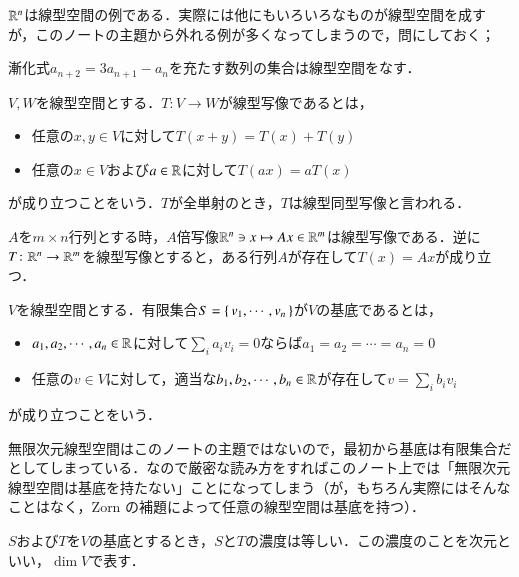 $\mathbb{R}^n$は線型空間の例である．実際には他にもいろいろなものが線型空間を成すが，このノートの主題から外れる例が多くなってしまうので，問にしておく；

\begin{que}
漸化式$a_{n+2} = 3a_{n+1} - a_n$を充たす数列の集合は線型空間をなす．
\end{que}

\begin{defi}
$V,W$を線型空間とする．$T \colon V \to W$が線型写像であるとは，
\begin{itemize}
\item 任意の$x,y \in V$に対して$T(x + y)=T(x) + T(y)$
\item 任意の$x \in V$および$a \in \mathbb{R}$に対して$T(ax) = aT(x)$
\end{itemize}
が成り立つことをいう．$T$が全単射のとき，$T$は線型同型写像と言われる．
\end{defi}

\begin{que}\label{線型写像と行列の対応}
$A$を$m \times n$行列とする時，$A$倍写像$\mathbb{R}^n \ni x \mapsto Ax \in \mathbb{R}^m$は線型写像である．逆に$T \colon \mathbb{R}^n \to \mathbb{R}^m$を線型写像とすると，ある行列$A$が存在して$T(x) = Ax$が成り立つ．
\end{que}

\begin{defi}
$V$を線型空間とする．有限集合$S = \set{v_1, \cdots, v_n}$が$V$の基底であるとは，
\begin{itemize}
\item $a_1, a_2, \cdots, a_n \in \mathbb{R}$に対して$\sum_i a_i v_i = 0$ならば$a_1 = a_2 = \cdots = a_n = 0$
\item 任意の$v \in V$に対して，適当な$b_1, b_2, \cdots, b_n \in \mathbb{R}$が存在して$v = \sum_i b_i v_i$
\end{itemize}
が成り立つことをいう．
\end{defi}

\begin{dig}
無限次元線型空間はこのノートの主題ではないので，最初から基底は有限集合だとしてしまっている．なので厳密な読み方をすればこのノート上では「無限次元線型空間は基底を持たない」ことになってしまう（が，もちろん実際にはそんなことはなく，Zorn の補題によって任意の線型空間は基底を持つ）．
\end{dig}

\begin{que}
$S$および$T$を$V$の基底とするとき，$S$と$T$の濃度は等しい．この濃度のことを次元といい，$\dim V$で表す．
\end{que}

